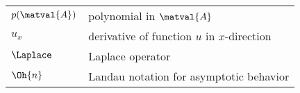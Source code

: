 \begin{longtable}{ll}
  $p(\matval{A})$ & polynomial in $\matval{A}$ \\

  $u_x$ & derivative of function $u$ in $x$-direction \\
  $\Laplace$ & Laplace operator \\

  $\Oh{n}$ & Landau notation for asymptotic behavior \\
  
\end{longtable}


